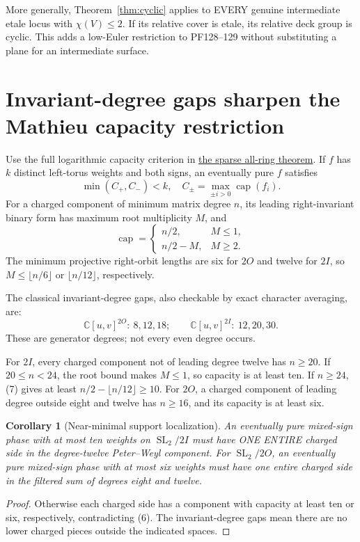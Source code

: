 \documentclass[11pt]{article}
\newtheorem{corollary}[theorem]{Corollary}
\newcommand{\C}{\mathbb C}
\newcommand{\SL}{\operatorname{SL}}
\begin{document}
More generally, Theorem~\ref{thm:cyclic} applies to EVERY genuine
intermediate etale locus with $\chi(V)\le2$. If its relative cover is
etale, its relative deck group is cyclic. This adds a low-Euler restriction
to PF128--129 without substituting a plane for an intermediate surface.

\section{Invariant-degree gaps sharpen the Mathieu capacity restriction}

Use the full logarithmic capacity criterion in
\href{../moment-vanishing-audit/LOGARITHMIC_JETS_AND_SPARSE_ALL_RING_SAFETY.md}{the sparse all-ring theorem}.
If $f$ has $k$ distinct left-torus weights and both signs, an eventually
pure $f$ satisfies
\[
    \min(C_+,C_-)<k,\quad
    C_\pm=\max_{\pm i>0}\operatorname{cap}(f_i).             \tag{6}
\]
For a charged component of minimum matrix degree $n$, its leading
right-invariant binary form has maximum root multiplicity $M$, and
\[
 \operatorname{cap}=
 \begin{cases}
 n/2,&M\le1,\\
 n/2-M,&M\ge2.
 \end{cases}                                               \tag{7}
\]
The minimum projective right-orbit lengths are six for $2O$ and twelve
for $2I$, so $M\le\lfloor n/6\rfloor$ or
$\lfloor n/12\rfloor$, respectively.

The classical invariant-degree gaps, also checkable by exact character
averaging, are:
\[
 \C[u,v]^{2O}:\ 8,12,18;\qquad
 \C[u,v]^{2I}:\ 12,20,30.                                  \tag{8}
\]
These are generator degrees; not every even degree occurs.

For $2I$, every charged component not of leading degree twelve has
$n\ge20$. If $20\le n<24$, the root bound makes $M\le1$, so capacity
is at least ten. If $n\ge24$, (7) gives at least
$n/2-\lfloor n/12\rfloor\ge10$.
For $2O$, a charged component of leading degree outside eight and
twelve has $n\ge16$, and its capacity is at least six.

\begin{corollary}[Near-minimal support localization]\label{cor:capacity}
An eventually pure mixed-sign phase with at most ten weights on
$\SL_2/2I$ must have ONE ENTIRE charged side in the degree-twelve
Peter--Weyl component.
For $\SL_2/2O$, an eventually pure mixed-sign phase with at most six
weights must have one entire charged side in the filtered sum of
degrees eight and twelve.
\end{corollary}
\begin{proof}
Otherwise each charged side has a component with capacity at least ten
or six, respectively, contradicting (6).
The invariant-degree gaps mean there are no lower charged pieces
outside the indicated spaces.
\end{proof}
\end{document}
